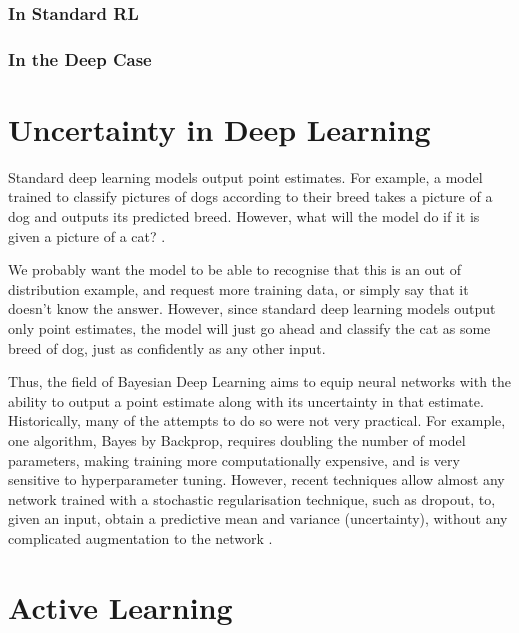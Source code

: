 \documentclass[11pt, a4paper, bibliography=totoc]{report}
\begin{document}
\subsubsection{In Standard RL}
\subsubsection{In the Deep Case}

\section{Uncertainty in Deep Learning}
Standard deep learning models output point estimates. For example, a model trained to classify pictures of dogs according to their breed takes a picture of a dog and outputs its predicted breed. However, what will the model do if it is given a picture of a cat? \cite{Gal2017a}.

We probably want the model to be able to recognise that this is an out of distribution example, and request more training data, or simply say that it doesn't know the answer. However, since standard deep learning models output only point estimates, the model will just go ahead and classify the cat as some breed of dog, just as confidently as any other input.

Thus, the field of Bayesian Deep Learning aims to equip neural networks with the ability to output a point estimate along with its uncertainty in that estimate. Historically, many of the attempts to do so were not very practical. For example, one algorithm, Bayes by Backprop, requires doubling the number of model parameters, making training more computationally expensive, and is very sensitive to hyperparameter tuning. However, recent techniques allow almost any network trained with a stochastic regularisation technique, such as dropout, to, given an input, obtain a predictive mean and variance (uncertainty), without any complicated augmentation to the network \cite[p.~15]{Gal2017a}.

\section{Active Learning}
\end{document}
